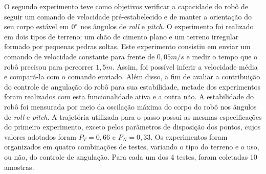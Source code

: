 \documentclass[../main.tex]{subfiles}
\begin{document}
  O segundo experimento teve como objetivos verificar a capacidade do robô de seguir um comando de velocidade pré-estabelecido e de manter a orientação do seu corpo estável em $0\degree$ nos ângulos de \textit{roll} e \textit{pitch}. O experimento foi realizado em dois tipos de terreno: um chão de cimento plano e um terreno irregular formado por pequenas pedras soltas. Este experimento consistiu em enviar um comando de velocidade constante para frente de $0,05 m/s$ e medir o tempo que o robô precisou para percorrer $1,5 m$. Assim, foi possível inferir a velocidade média e compará-la com o comando enviado. Além disso, a fim de avaliar a contribuição do controle de angulação do robô para sua estabilidade, metade dos experimentos foram realizados com esta funcionalidade ativa e a outra não. A estabilidade do robô foi mensurada por meio da oscilação máxima do corpo do robô nos ângulos de \textit{roll} e \textit{pitch}. A trajetória utilizada para o passo possui as mesmas especificações do primeiro experimento, exceto pelos parâmetros de disposição dos pontos, cujos valores adotados foram $P_T = 0,66$ e $P_N = 0,33$. Os experimentos foram organizados em quatro combinações de testes, variando o tipo do terreno e o uso, ou não, do controle de angulação. Para cada um dos 4 testes, foram coletadas 10 amostras.
  
\end{document}
